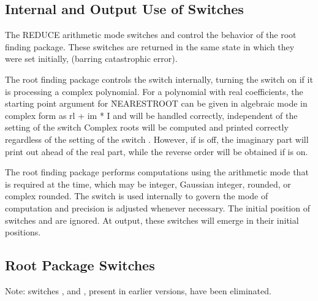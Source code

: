 \subsection{Internal and Output Use of Switches}

The REDUCE arithmetic mode switches  and 
control the behavior of the root finding package.
These switches are returned in the same state in which they were set
initially, (barring catastrophic error).

\begin{description}
\item[\sw{COMPLEX}] The root finding package controls the switch 
internally, turning the switch on if it is processing a complex
polynomial.
For a polynomial with real coefficients, the
starting point argument for \f{NEARESTROOT} can be given in algebraic mode in
complex form as rl + im * I and will be handled correctly, independent of
the setting of the switch  Complex roots will be computed
and printed correctly regardless of the setting of the switch .
However, if  is off, the imaginary part will print
out ahead of the real part, while the reverse order will be obtained if
 is on.

\item[\sw{ROUNDED}] The
root finding package performs computations using the arithmetic mode that
is required at the time, which may be integer, Gaussian integer, rounded,
or complex rounded.  The switch  is used internally to govern
the mode of computation and precision is adjusted whenever necessary.  The
initial position of switches  and  are ignored.
At output, these switches will emerge in their initial positions.
\end{description}

\subsection{Root Package Switches}

Note: switches ,  and , present in
earlier versions, have been eliminated.

